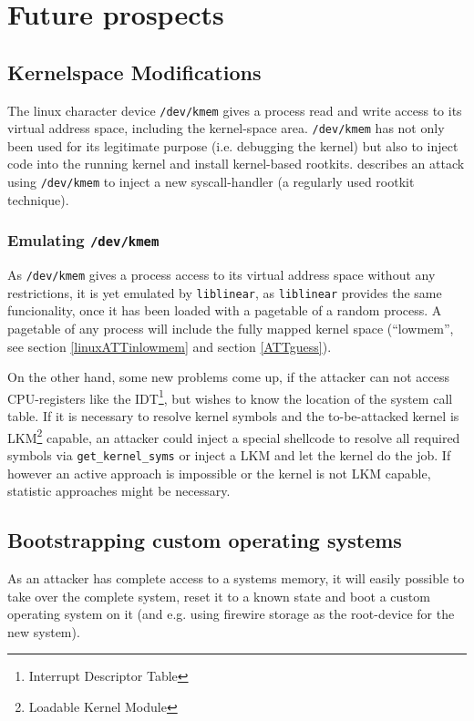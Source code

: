 %
%

\section{Future prospects}

\subsection{Kernelspace Modifications}

The linux character device \texttt{/dev/kmem} gives a process read and write
access to its virtual address space, including the kernel-space area.
\texttt{/dev/kmem} has not only been used for its legitimate purpose (i.e.
debugging the kernel) but also to inject code into the running kernel and
install kernel-based rootkits. \cite{phrack58.7:2001} describes an attack using
\texttt{/dev/kmem} to inject a new syscall-handler (a regularly used rootkit
technique).

\subsubsection{Emulating \texttt{/dev/kmem}}

As \texttt{/dev/kmem} gives a process access to its virtual address space
without any restrictions, it is yet emulated by \texttt{liblinear}, as
\texttt{liblinear} provides the same funcionality, once it has been loaded with
a pagetable of a random process.  A pagetable of any process will include the
fully mapped kernel space (``lowmem'', see section \ref{linuxATTinlowmem} and
section \ref{ATTguess}).

On the other hand, some new problems come up, if the attacker can not access
CPU-registers like the IDT\footnote{Interrupt Descriptor Table}, but wishes to
know the location of the system call table. If it is necessary to resolve kernel
symbols and the to-be-attacked kernel is LKM\footnote{Loadable Kernel Module}
capable, an attacker could inject a special shellcode to resolve all required
symbols via \texttt{get\_kernel\_syms} or inject a LKM and let the kernel do the
job. If however an active approach is impossible or the kernel is not LKM
capable, statistic approaches might be necessary.

\subsection{Bootstrapping custom operating systems}

As an attacker has complete access to a systems memory, it will easily possible
to take over the complete system, reset it to a known state and boot a custom
operating system on it (and e.g. using firewire storage as the root-device for
the new system). 

